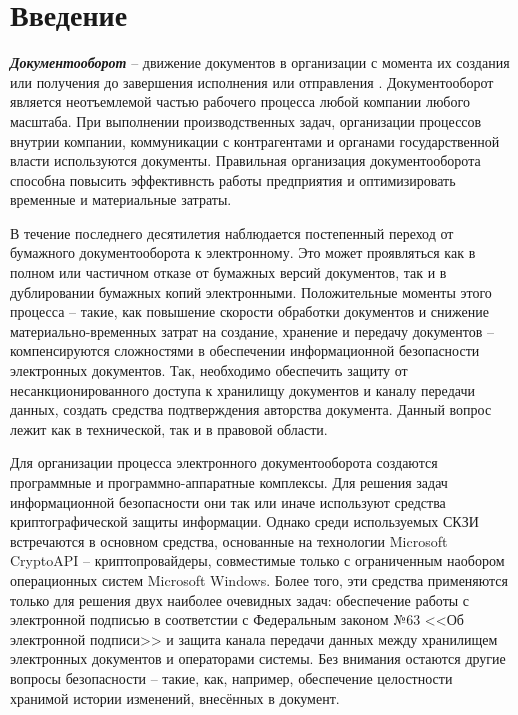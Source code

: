 \section{Введение} \label{subsect1_1}

\textbf{\textit{Документооборот}} -- движение документов в организации с момента их создания или получения до завершения исполнения или отправления \cite{bib1}.
Документооборот является неотъемлемой частью рабочего процесса любой компании любого масштаба. При выполнении производственных задач, организации процессов внутрии компании, коммуникации с контрагентами и органами государственной власти используются документы. Правильная организация документооборота способна повысить эффективнсть работы предприятия и оптимизировать временные и материальные затраты.

\vspace{\baselineskip}
В течение последнего десятилетия наблюдается постепенный переход от бумажного документооборота к электронному. Это может проявляться как в полном или частичном отказе от бумажных версий документов, так и в дублировании бумажных копий электронными. Положительные моменты этого процесса -- такие, как повышение скорости обработки документов и снижение материально-временных затрат на создание, хранение и передачу документов -- компенсируются сложностями в обеспечении информационной безопасности электронных документов. Так, необходимо обеспечить защиту от несанкционированного доступа к хранилищу документов и каналу передачи данных, создать средства подтверждения авторства документа. Данный вопрос лежит как в технической, так и в правовой области.

\vspace{\baselineskip}
Для организации процесса электронного документооборота создаются программные и программно-аппаратные комплексы. Для решения задач информационной безопасности они так или иначе используют средства криптографической защиты информации. Однако среди используемых СКЗИ встречаются в основном средства, основанные на технологии Microsoft CryptoAPI -- криптопровайдеры, совместимые только с ограниченным наобором операционных систем Microsoft Windows. Более того, эти средства применяются только для решения двух наиболее очевидных задач: обеспечение работы с электронной подписью в соответстии с Федеральным законом №63 <<Об электронной подписи>> и защита канала передачи данных между хранилищем электронных документов и операторами системы. Без внимания остаются другие вопросы безопасности -- такие, как, например, обеспечение целостности хранимой истории изменений, внесённых в документ.

